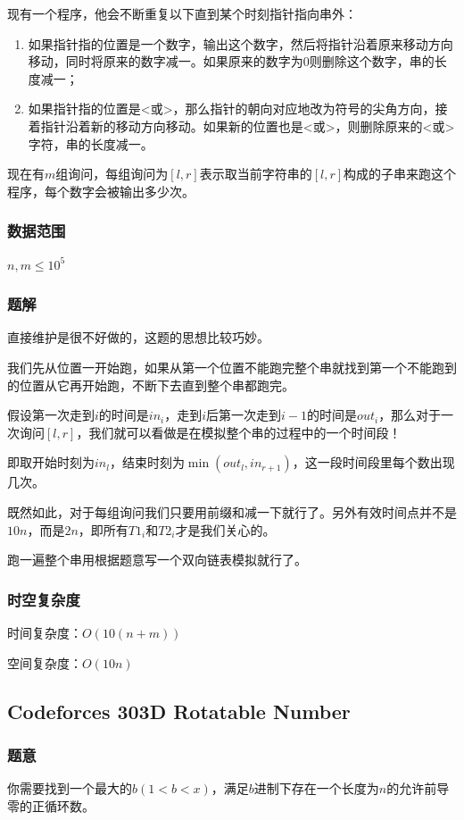 \documentclass{ctexart}
\begin{document}
现有一个程序，他会不断重复以下直到某个时刻指针指向串外：
\begin{enumerate}
\item 如果指针指的位置是一个数字，输出这个数字，然后将指针沿着原来移动方向移动，同时将原来的数字减一。如果原来的数字为$0$则删除这个数字，串的长度减一；
\item 如果指针指的位置是<或>，那么指针的朝向对应地改为符号的尖角方向，接着指针沿着新的移动方向移动。如果新的位置也是<或>，则删除原来的<或>字符，串的长度减一。
\end{enumerate}

现在有$m$组询问，每组询问为$[l,r]$表示取当前字符串的$[l,r]$构成的子串来跑这个程序，每个数字会被输出多少次。
\subsubsection{数据范围}
$n,m \le 10^5$
\subsubsection{题解}
直接维护是很不好做的，这题的思想比较巧妙。

我们先从位置一开始跑，如果从第一个位置不能跑完整个串就找到第一个不能跑到的位置从它再开始跑，不断下去直到整个串都跑完。

假设第一次走到$i$的时间是$in_i$，走到$i$后第一次走到$i-1$的时间是$out_i$，那么对于一次询问$[l,r]$，我们就可以看做是在模拟整个串的过程中的一个时间段！

即取开始时刻为$in_l$，结束时刻为$\min(out_l,in_{r+1})$，这一段时间段里每个数出现几次。

既然如此，对于每组询问我们只要用前缀和减一下就行了。另外有效时间点并不是$10n$，而是$2n$，即所有$T1_i$和$T2_i$才是我们关心的。

跑一遍整个串用根据题意写一个双向链表模拟就行了。
\subsubsection{时空复杂度}
时间复杂度：$O(10(n+m))$

空间复杂度：$O(10n)$
\subsection{Codeforces 303D Rotatable Number}
\subsubsection{题意}
你需要找到一个最大的$b(1<b<x)$，满足$b$进制下存在一个长度为$n$的允许前导零的正循环数。
\end{document}
